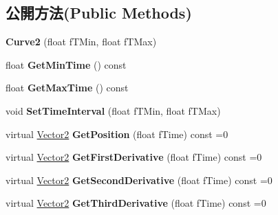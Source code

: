 \subsection*{公開方法(Public Methods)}
\begin{DoxyCompactItemize}
\item 
{\bfseries Curve2} (float f\+T\+Min, float f\+T\+Max)\hypertarget{class_magnum_1_1_curve2_ac5aca014a0a94e4785fa5e4f6b07fda6}{}\label{class_magnum_1_1_curve2_ac5aca014a0a94e4785fa5e4f6b07fda6}

\item 
float {\bfseries Get\+Min\+Time} () const \hypertarget{class_magnum_1_1_curve2_af55a76f146ab62a12831b4bb1f9b0223}{}\label{class_magnum_1_1_curve2_af55a76f146ab62a12831b4bb1f9b0223}

\item 
float {\bfseries Get\+Max\+Time} () const \hypertarget{class_magnum_1_1_curve2_aca66d3bb4cb61eb11fa40224cfa6b06b}{}\label{class_magnum_1_1_curve2_aca66d3bb4cb61eb11fa40224cfa6b06b}

\item 
void {\bfseries Set\+Time\+Interval} (float f\+T\+Min, float f\+T\+Max)\hypertarget{class_magnum_1_1_curve2_a6856d454c51e35d835a74e1d36adc8f2}{}\label{class_magnum_1_1_curve2_a6856d454c51e35d835a74e1d36adc8f2}

\item 
virtual \hyperlink{class_magnum_1_1_vector2}{Vector2} {\bfseries Get\+Position} (float f\+Time) const  =0\hypertarget{class_magnum_1_1_curve2_a99203db56d534ea0ce86023b6ada0744}{}\label{class_magnum_1_1_curve2_a99203db56d534ea0ce86023b6ada0744}

\item 
virtual \hyperlink{class_magnum_1_1_vector2}{Vector2} {\bfseries Get\+First\+Derivative} (float f\+Time) const  =0\hypertarget{class_magnum_1_1_curve2_a67b73c845ffe718576434174f91be0fd}{}\label{class_magnum_1_1_curve2_a67b73c845ffe718576434174f91be0fd}

\item 
virtual \hyperlink{class_magnum_1_1_vector2}{Vector2} {\bfseries Get\+Second\+Derivative} (float f\+Time) const  =0\hypertarget{class_magnum_1_1_curve2_a99d6b046fc8d281c92262810dc4656c1}{}\label{class_magnum_1_1_curve2_a99d6b046fc8d281c92262810dc4656c1}

\item 
virtual \hyperlink{class_magnum_1_1_vector2}{Vector2} {\bfseries Get\+Third\+Derivative} (float f\+Time) const  =0\hypertarget{class_magnum_1_1_curve2_acffbeb31e5b01fd774a50ed84cc07963}{}\label{class_magnum_1_1_curve2_acffbeb31e5b01fd774a50ed84cc07963}


\end{DoxyCompactItemize}
